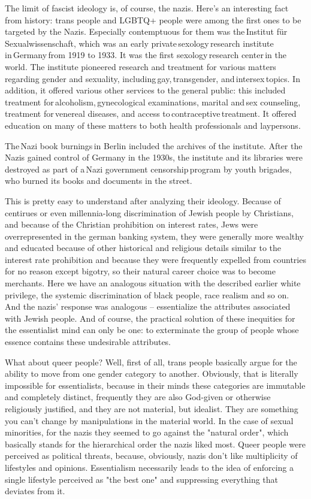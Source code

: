 \documentclass[12 pt, a4paper]{article}
\begin{document}
The limit of fascist ideology is, of course, the nazis. Here's an interesting fact from history: trans people and LGBTQ+ people were among the first ones to be targeted by the Nazis. Especially contemptuous for them was the Institut für Sexualwissenschaft, which was an early private sexology research institute in Germany from 1919 to 1933. It was the first sexology research center in the world. The institute pioneered research and treatment for various matters regarding gender and sexuality, including gay, transgender, and intersex topics. In addition, it offered various other services to the general public: this included treatment for alcoholism, gynecological examinations, marital and sex counseling, treatment for venereal diseases, and access to contraceptive treatment. It offered education on many of these matters to both health professionals and laypersons.

The Nazi book burnings in Berlin included the archives of the institute. After the Nazis gained control of Germany in the 1930s, the institute and its libraries were destroyed as part of a Nazi government censorship program by youth brigades, who burned its books and documents in the street. 

This is pretty easy to understand after analyzing their ideology. Because of centirues or even millennia-long discrimination of Jewish people by Christians, and because of the Christian prohibition on interest rates, Jews were overrepresented in the german banking system, they were generally more wealthy and educated because of other historical and religious details similar to the interest rate prohibition and because they were frequently expelled from countries for no reason except bigotry, so their natural career choice was to become merchants. Here we have an analogous situation with the described earlier white privilege, the systemic discrimination of black people, race realism and so on. And the nazis' response was analogous – essentialize the attributes associated with Jewish people. And of course, the practical solution of these inequities for the essentialist mind can only be one: to exterminate the group of people whose essence contains these undesirable attributes. 

What about queer people? Well, first of all, trans people basically argue for the ability to move from one gender category to another. Obviously, that is literally impossible for essentialists, because in their minds these categories are immutable and completely distinct, frequently they are also God-given or otherwise religiously justified, and they are not material, but idealist. They are something you can't change by manipulations in the material world. In the case of sexual minorities, for the nazis they seemed to go against the "natural order", which basically stands for the hierarchical order the nazis liked most. Queer people were perceived as political threats, because, obviously, nazis don't like multiplicity of lifestyles and opinions. Essentialism necessarily leads to the idea of enforcing a single lifestyle perceived as "the best one" and suppressing everything that deviates from it. 
\end{document}
